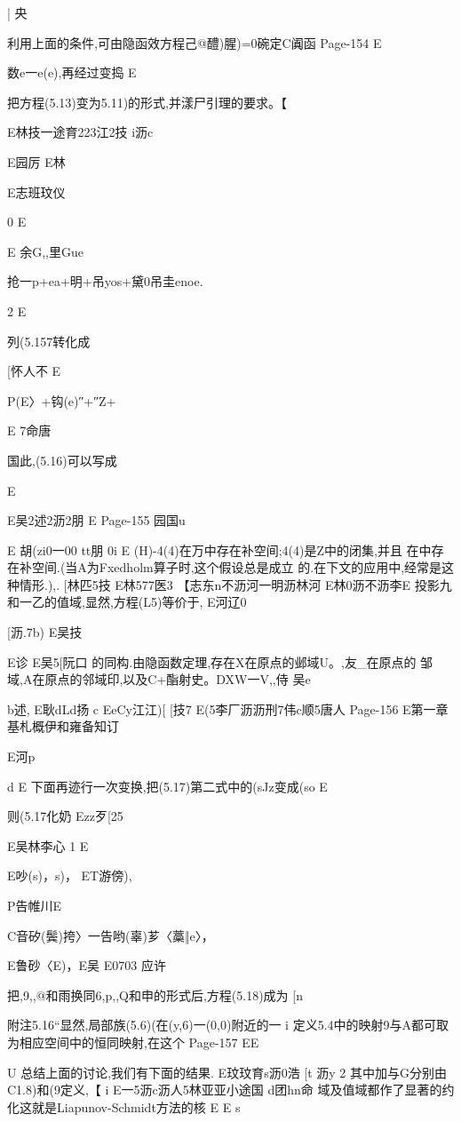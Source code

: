 {{{{{{{{{{{{{{{|
央

利用上面的条件,可由隐函效方程己@醴)腥)=0碗定C阗函
Page-154
E

数e一e(e),再经过变捣
E

把方程(5.13)变为5.11)的形式,并漾尸引理的要求。【

E林技一途育223江2技
i沥c

E园厉
E林

E志班玟仪

0
E

E
余G,,里Gue
{抢一p+ea+明+吊yos+黛0吊圭enoe.

2
E

列(5.157转化成

[怀人不
E{P(E〉+钩(e)″+″Z+

E
7命唐

国此,(5.16)可以写成

E

E吴2述2沥2朋
E
Page-155
园国u

E
胡(zi0一00
tt朋
0i
E
(H)-4(4)在万中存在补空间;4(4)是Z中的闭集,并且
在中存在补空间.(当A为Fxedholm算子时,这个假设总是成立
的.在下文的应用中,经常是这种情形.),.
[林匹5技
E林577医3
【志东n不沥河一明沥林河
E林0沥不沥李E
投影九和一乙的值域,显然,方程(L5)等价于,
E河辽0

[沥.7b)
E吴技

E诊
E吴5[阮口
的同构.由隐函数定理,存在X在原点的邺域U。,友_在原点的
邹域,A在原点的邻域印,以及C+酯射史。DXW一V,,侍
吴e

b述,
E耿dLd扬
c
EeCy江江)[
[技7
E(5李厂沥沥刑7伟c顺5唐人
Page-156
E第一章基札概伊和雍备知订

E河p

d
E
下面再迹行一次变换,把(5.17)第二式中的(sJz变成(so
E

则(5.17化奶
Ezz歹[25

E吴林李心
1
E

E吵(s)，s)，
ET游傍),

P告帷川E

C音矽(鬓)挎〉一告哟(辜)芗〈藁‖e〉，

E鲁砂〈E)，E吴
E0703
应许

把,9,,@和雨换同6,p,,Q和申的形式后,方程(5.18)成为
[n

附注5.16“显然,局部族(5.6)(在(y,6)一(0,0)附近的一
i
定义5.4中的映射9与A都可取为相应空间中的恒同映射,在这个
Page-157
EE

U
总结上面的讨论,我们有下面的结果.
E玟玟育s沥0浩
[t
沥y
2
其中加与G分别由C1.8)和(9定义,【
i
E一5沥c沥人5林亚亚小途国
d团hn命
域及值域都作了显著的约化这就是Liapunov-Schmidt方法的核
E
E
s

}}}}}}}}}}}}}}}}}
